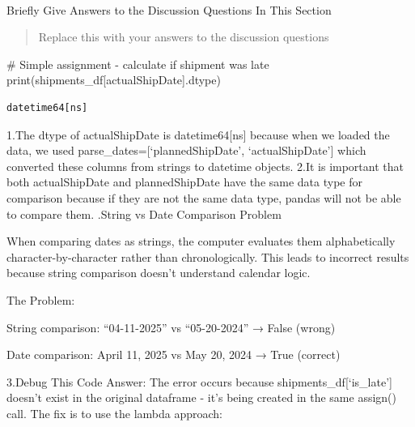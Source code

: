 \documentclass[
  letterpaper,
  DIV=11,
  numbers=noendperiod]{scrartcl}
\makeatletter
\let\oldparagraph\paragraph
\renewcommand{\paragraph}{
    \@ifstar
      \xxxParagraphStar
      \xxxParagraphNoStar
  }
\newcommand{\xxxParagraphStar}[1]{\oldparagraph*{#1}\mbox{}}
\newcommand{\xxxParagraphNoStar}[1]{\oldparagraph{#1}\mbox{}}
\newenvironment{Shaded}{\begin{snugshade}}{\end{snugshade}}
\newcommand{\BuiltInTok}[1]{\textcolor[rgb]{0.00,0.23,0.31}{#1}}
\newcommand{\CommentTok}[1]{\textcolor[rgb]{0.37,0.37,0.37}{#1}}
\newcommand{\NormalTok}[1]{\textcolor[rgb]{0.00,0.23,0.31}{#1}}
\newcommand{\StringTok}[1]{\textcolor[rgb]{0.13,0.47,0.30}{#1}}
\makeatother
\begin{document}
\paragraph{Briefly Give Answers to the Discussion Questions In This
Section}\label{briefly-give-answers-to-the-discussion-questions-in-this-section}

\begin{quote}
Replace this with your answers to the discussion questions
\end{quote}

\begin{Shaded}
\begin{Highlighting}[]
\CommentTok{\# Simple assignment {-} calculate if shipment was late}
\BuiltInTok{print}\NormalTok{(shipments\_df[}\StringTok{\textquotesingle{}actualShipDate\textquotesingle{}}\NormalTok{].dtype)}
\end{Highlighting}
\end{Shaded}

\begin{verbatim}
datetime64[ns]
\end{verbatim}

1.The dtype of actualShipDate is datetime64{[}ns{]} because when we
loaded the data, we used parse\_dates={[}`plannedShipDate',
`actualShipDate'{]} which converted these columns from strings to
datetime objects. 2.It is important that both actualShipDate and
plannedShipDate have the same data type for comparison because if they
are not the same data type, pandas will not be able to compare them.
.String vs Date Comparison Problem

When comparing dates as strings, the computer evaluates them
alphabetically character-by-character rather than chronologically. This
leads to incorrect results because string comparison doesn't understand
calendar logic.

The Problem:

String comparison: ``04-11-2025'' vs ``05-20-2024'' → False (wrong)

Date comparison: April 11, 2025 vs May 20, 2024 → True (correct)

3.Debug This Code Answer: The error occurs because
shipments\_df{[}`is\_late'{]} doesn't exist in the original dataframe -
it's being created in the same assign() call. The fix is to use the
lambda approach:
\end{document}
